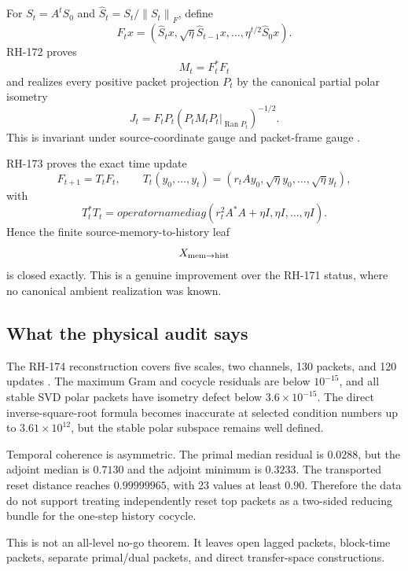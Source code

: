 \documentclass[12pt]{article}
\theoremstyle{remark}
\newcommand{\norm}[1]{\left\lVert#1\right\rVert}
\begin{document}
For $S_t=A^tS_0$ and $\widehat S_t=S_t/\norm{S_t}_F$, define
\[
 F_tx=(\widehat S_tx,\sqrt\eta\widehat S_{t-1}x,
 \ldots,\eta^{t/2}\widehat S_0x).
\]
RH-172 proves
\begin{equation}\label{eq:gram}
 M_t=F_t^*F_t
\end{equation}
and realizes every positive packet projection $P_t$ by the canonical partial
polar isometry
\begin{equation}\label{eq:polar}
 J_t=F_tP_t(P_tM_tP_t|_{\operatorname{Ran}P_t})^{-1/2}.
\end{equation}
This is invariant under source-coordinate gauge and packet-frame gauge
\citep{WangRH172}.

RH-173 proves the exact time update
\begin{equation}\label{eq:cocycle}
 F_{t+1}=T_tF_t,
 \qquad
 T_t(y_0,\ldots,y_t)=
 (r_tAy_0,\sqrt\eta y_0,\ldots,\sqrt\eta y_t),
\end{equation}
with
\[
 T_t^*T_t=operatorname{diag}(r_t^2A^*A+\eta I,
 \eta I,\ldots,\eta I).
\]
Hence the finite source-memory-to-history leaf
\[
 X_{\rm mem\to hist}
\]
is closed exactly.  This is a genuine improvement over the RH-171 status,
where no canonical ambient realization was known.

\subsection{What the physical audit says}

The RH-174 reconstruction covers five scales, two channels, 130 packets, and
120 updates \citep{WangRH174}.  The maximum Gram and cocycle residuals are
below $10^{-15}$, and all stable SVD polar packets have isometry defect below
$3.6\times10^{-15}$.  The direct inverse-square-root formula becomes
inaccurate at selected condition numbers up to $3.61\times10^{12}$, but the
stable polar subspace remains well defined.

Temporal coherence is asymmetric.  The primal median residual is $0.0288$,
but the adjoint median is $0.7130$ and the adjoint minimum is $0.3233$.  The
transported reset distance reaches $0.99999965$, with 23 values at least
$0.90$.  Therefore the data do not support treating independently reset top
packets as a two-sided reducing bundle for the one-step history cocycle.

This is not an all-level no-go theorem.  It leaves open lagged packets,
block-time packets, separate primal/dual packets, and direct transfer-space
constructions.
\end{document}
